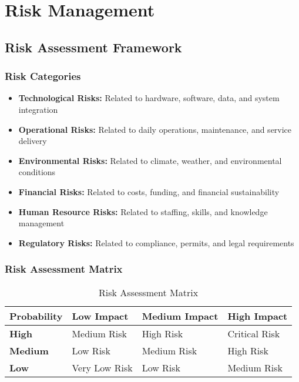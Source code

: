 \section{Risk Management}

\subsection{Risk Assessment Framework}

\subsubsection{Risk Categories}
\begin{itemize}
    \item \textbf{Technological Risks:} Related to hardware, software, data, and system integration
    \item \textbf{Operational Risks:} Related to daily operations, maintenance, and service delivery
    \item \textbf{Environmental Risks:} Related to climate, weather, and environmental conditions
    \item \textbf{Financial Risks:} Related to costs, funding, and financial sustainability
    \item \textbf{Human Resource Risks:} Related to staffing, skills, and knowledge management
    \item \textbf{Regulatory Risks:} Related to compliance, permits, and legal requirements
\end{itemize}

\subsubsection{Risk Assessment Matrix}
\begin{table}[H]
\centering
\begin{tabular}{|l|l|l|l|}
\hline
\textbf{Probability} & \textbf{Low Impact} & \textbf{Medium Impact} & \textbf{High Impact} \\
\hline
\textbf{High} & Medium Risk & High Risk & Critical Risk \\
\hline
\textbf{Medium} & Low Risk & Medium Risk & High Risk \\
\hline
\textbf{Low} & Very Low Risk & Low Risk & Medium Risk \\
\hline
\end{tabular}
\caption{Risk Assessment Matrix}
\end{table}

